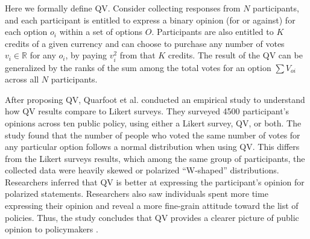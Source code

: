 
Here we formally define QV. Consider collecting responses from $N$ participants, and each participant is entitled to express a binary opinion (for or against) for each option $o_i$ within a set of options $O$. Participants are also entitled to $K$ credits of a given currency and can choose to purchase any number of votes $v_i \in \mathbb{R}$ for any $o_i$, by paying $v_i^2$ from that $K$ credits. The result of the QV can be generalized by the ranks of the sum among the total votes for an option $\sum{V_{oi}}$ across all $N$ participants.\par

After proposing QV, Quarfoot et al. \cite{quarfoot2017quadratic} conducted an empirical study to understand how QV results compare to Likert surveys. They surveyed 4500 participant's opinions across ten public policy, using either a Likert survey, QV, or both. The study found that the number of people who voted the same number of votes for any particular option follows a normal distribution when using QV. This  differs from the Likert surveys results, which among the same group of participants, the collected data were heavily skewed or polarized ``W-shaped'' distributions. Researchers inferred that QV is better at expressing the participant's opinion for polarized statements. Researchers also saw individuals spent more time expressing their opinion and reveal a more fine-grain attitude toward the list of policies. Thus, the study concludes that QV provides a clearer picture of public opinion to policymakers \cite{quarfoot2017quadratic}.

